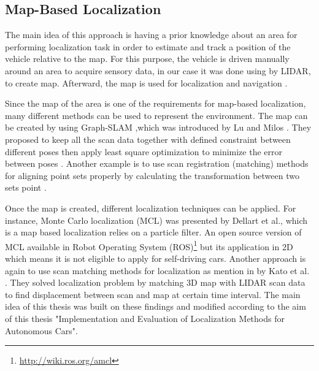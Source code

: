 \subsection*{Map-Based Localization}
The main idea of this approach is having a prior knowledge about an area for performing localization task in order to estimate and track a position of the vehicle relative to the map. For this purpose, the vehicle is driven manually around an area to acquire sensory data, in our case it was done using by LIDAR, to create map. Afterward, the map is used for localization and navigation \cite{map}. 
\par Since the map of the area is one of the requirements for map-based localization, many different methods can be used to represent the environment. The map can be created by using Graph-SLAM ,which was introduced by Lu and Milos \cite{map3}. They proposed to keep all the scan data together with defined constraint between different poses then apply least square optimization to minimize the error between poses \cite{map4}. Another example is to use scan registration (matching) methods for aligning point sets properly by calculating the transformation between two sets point \cite{icp,3dndt}. 
\par Once the map is created, different localization techniques can be applied. For instance, Monte Carlo localization (MCL) was presented by Dellart et al.\cite{map5}, which is a map based localization relies on a particle filter. An open source version of MCL available in Robot Operating System (ROS)\footnote{\url{http://wiki.ros.org/amcl}} but its application in 2D which means it is not eligible to apply for self-driving cars. Another approach is again to use scan matching methods for localization as mention in by Kato et al. \cite{map1} . They solved localization problem by matching 3D map with LIDAR scan data to find displacement between scan and map at certain time interval. The main idea of this thesis was built on these findings and modified according to the aim of this thesis "Implementation and Evaluation of Localization Methods for Autonomous Cars".

